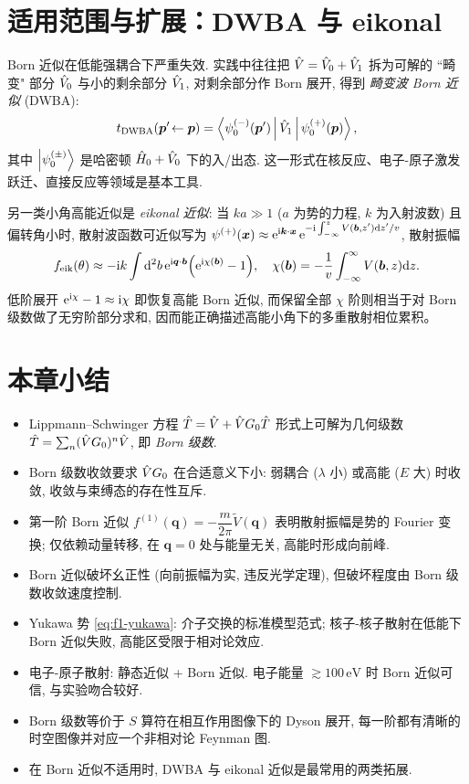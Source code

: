 \section{适用范围与扩展：DWBA 与 eikonal}\label{sec:extensions}

Born 近似在低能强耦合下严重失效. 实践中往往把 $\hat{V}=\hat{V}_{0}+\hat{V}_{1}$ 拆为可解的 ``畸变" 部分 $\hat{V}_{0}$ 与小的剩余部分 $\hat{V}_{1}$, 对剩余部分作 Born 展开, 得到 \emph{畸变波 Born 近似} (DWBA):
\begin{equation}
t_{\text{DWBA}}(\bm p'\!\leftarrow\bm p)=\left\langle \psi^{(-)}_{0}(\bm p') \,\middle|\, \hat{V}_{1} \,\middle|\, \psi^{(+)}_{0}(\bm p) \right\rangle,
\end{equation}
其中 $\ket{\psi^{(\pm)}_{0}}$ 是哈密顿 $\hat{H}_{0}+\hat{V}_{0}$ 下的入/出态. 这一形式在核反应、电子-原子激发跃迁、直接反应等领域是基本工具.

另一类小角高能近似是 \emph{eikonal 近似}: 当 $ka\gg 1$ ($a$ 为势的力程, $k$ 为入射波数) 且偏转角小时, 散射波函数可近似写为 $\psi^{(+)}(\bm x)\approx\mathrm{e}^{\mathrm{i}\bm k\cdot\bm x}\,\mathrm{e}^{-\mathrm{i}\int_{-\infty}^{z}V(\bm b,z')\mathrm{d} z'/v}$, 散射振幅
\begin{equation}
f_{\text{eik}}(\theta)\approx -\mathrm{i} k\int\mathrm{d}^{2}b\,\mathrm{e}^{\mathrm{i}\bm q\cdot\bm b}
\Bigl(\mathrm{e}^{\mathrm{i}\chi(\bm b)}-1\Bigr),\quad
\chi(\bm b)=-\frac{1}{v}\int_{-\infty}^{\infty}V(\bm b,z)\mathrm{d} z.
\end{equation}
低阶展开 $\mathrm{e}^{\mathrm{i}\chi}-1\approx\mathrm{i}\chi$ 即恢复高能 Born 近似, 而保留全部 $\chi$ 阶则相当于对 Born 级数做了无穷阶部分求和, 因而能正确描述高能小角下的多重散射相位累积。

\section*{本章小结}

\begin{itemize}
  \item Lippmann--Schwinger 方程 $\hat{T}=\hat{V}+\hat{V} G_{0}\hat{T}$ 形式上可解为几何级数 $\hat{T}=\sum_{n}(\hat{V} G_{0})^{n}\hat{V}$, 即 \emph{Born 级数}.
  \item Born 级数收敛要求 $\hat{V} G_{0}$ 在合适意义下小: 弱耦合 ($\lambda$ 小) 或高能 ($E$ 大) 时收敛, 收敛与束缚态的存在性互斥.
  \item 第一阶 Born 近似 $f^{(1)}(\bm q)=-\dfrac{m}{2\pi}\tilde V(\bm q)$ 表明散射振幅是势的 Fourier 变换; 仅依赖动量转移, 在 $\bm q=0$ 处与能量无关, 高能时形成向前峰.
  \item Born 近似破坏幺正性 (向前振幅为实, 违反光学定理), 但破坏程度由 Born 级数收敛速度控制.
  \item Yukawa 势 \eqref{eq:f1-yukawa}: 介子交换的标准模型范式; 核子-核子散射在低能下 Born 近似失败, 高能区受限于相对论效应.
  \item 电子-原子散射: 静态近似 + Born 近似. 电子能量 $\gtrsim 100\,\mathrm{eV}$ 时 Born 近似可信, 与实验吻合较好.
  \item Born 级数等价于 $S$ 算符在相互作用图像下的 Dyson 展开, 每一阶都有清晰的时空图像并对应一个非相对论 Feynman 图.
  \item 在 Born 近似不适用时, DWBA 与 eikonal 近似是最常用的两类拓展.
\end{itemize}

